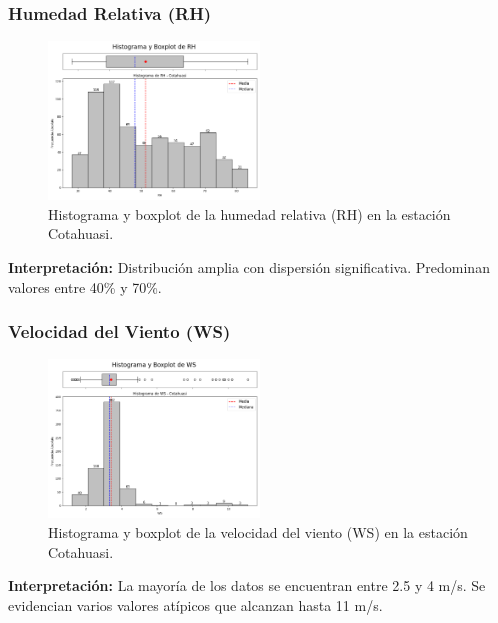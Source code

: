 \subsubsection*{Humedad Relativa (RH)}
\begin{figure}[H]
\centering
\includegraphics[width=0.5\textwidth]{resultados/por_estacion_meteorologica/Cotahuasi/RH_histograma.png}
\caption{Histograma y boxplot de la humedad relativa (RH) en la estación Cotahuasi.}
\label{fig:cotahuasi_RH}
\end{figure}
\textbf{Interpretación:} Distribución amplia con dispersión significativa. Predominan valores entre 40\% y 70\%.

\subsubsection*{Velocidad del Viento (WS)}
\begin{figure}[H]
\centering
\includegraphics[width=0.5\textwidth]{resultados/por_estacion_meteorologica/Cotahuasi/WS_histograma.png}
\caption{Histograma y boxplot de la velocidad del viento (WS) en la estación Cotahuasi.}
\label{fig:cotahuasi_WS}
\end{figure}
\textbf{Interpretación:} La mayoría de los datos se encuentran entre 2.5 y 4 m/s. Se evidencian varios valores atípicos que alcanzan hasta 11 m/s.

